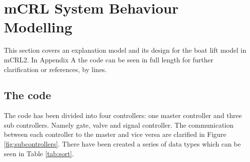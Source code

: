 \section{mCRL System Behaviour Modelling}
This section covers an explanation model and its design for the boat lift model in mCRL2. In Appendix A the code can be seen in full length for further clarification or references, by lines.
\subsection{The code}
The code has been divided into four controllers: one master controller and three sub controllers. Namely gate, valve and signal controller. The communication between each controller to the master and vice versa are clarified in Figure \ref{fig:subcontrollers}.
There have been created a series of data types which can be seen in Table \ref{tab:sort}.

